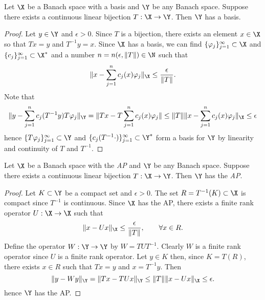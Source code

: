 \begin{lemma}
\label{lemma:schauder_schauder}
Let \(\X\) be a Banach space with a basis and \(\Y\) be any Banach space. Suppose there exists a continuous linear bijection \(T : \X \to \Y\).
Then \(\Y\) has a basis. 
\end{lemma}
\begin{proof}
Let \(y \in \Y\) and \(\epsilon > 0\). Since \(T\) is a bijection, there exists an element \(x \in \X\) so that \(Tx = y\) and \(T^{-1}y = x\).
Since \(\X\) has a basis, we can find \(\{\varphi_j\}_{j=1}^\infty \subset \X\) and \(\{c_j\}_{j=1}^\infty \subset \X^*\) 
and a number \(n = n(\epsilon, \|T\|) \in \N\) such that
\[\|x - \sum_{j=1}^n c_j(x) \varphi_j \|_\X \leq \frac{\epsilon}{\|T\|}.\]
Note that
\[
\|y - \sum_{j=1}^n c_j(T^{-1}y) T\varphi_j \|_\Y = \|Tx - T \sum_{j=1}^n c_j(x)\varphi_j\| \leq \|T\| \|x - \sum_{j=1}^n c_j(x) \varphi_j \|_\X \leq \epsilon
\]
hence \(\{T \varphi_j\}_{j=1}^\infty \subset \Y\) and \(\{c_j(T^{-1} \cdot)\}_{j=1}^\infty \subset \Y^*\) form a basis for \(\Y\)
by linearity and continuity of \(T\) and \(T^{-1}\).
\end{proof}



\begin{lemma}
\label{lemma:ap_ap}
Let \(\X\) be a Banach space with the \emph{AP} and \(\Y\) be any Banach space. Suppose there exists a continuous linear bijection \(T : \X \to \Y\).
Then \(\Y\) has the \emph{AP}. 
\end{lemma}
\begin{proof}
Let \(K \subset \Y\) be a compact set and \(\epsilon > 0\). The set \(R = T^{-1}(K) \subset \X\) is compact since \(T^{-1}\)
is continuous. Since \(\X\) has the AP, there exists a finite rank operator \(U : \X \to \X\) such that
\[\|x - Ux\|_\X \leq \frac{\epsilon}{\|T\|}, \qquad \forall x \in R.\]
Define the operator \(W : \Y \to \Y\) by \(W = T U T^{-1}\). Clearly \(W\) is a finite rank operator since \(U\) is a finite rank operator. Let \(y \in K\) then,
since \(K = T(R)\), there exists \(x \in R\) such that \(Tx = y\) and \(x = T^{-1}y\).
Then
\[
\|y - Wy\|_\Y = \|Tx - TUx\|_\Y \leq \|T\| \|x - Ux\|_\X \leq \epsilon.
\]
hence \(\Y\) has the AP.
\end{proof}


